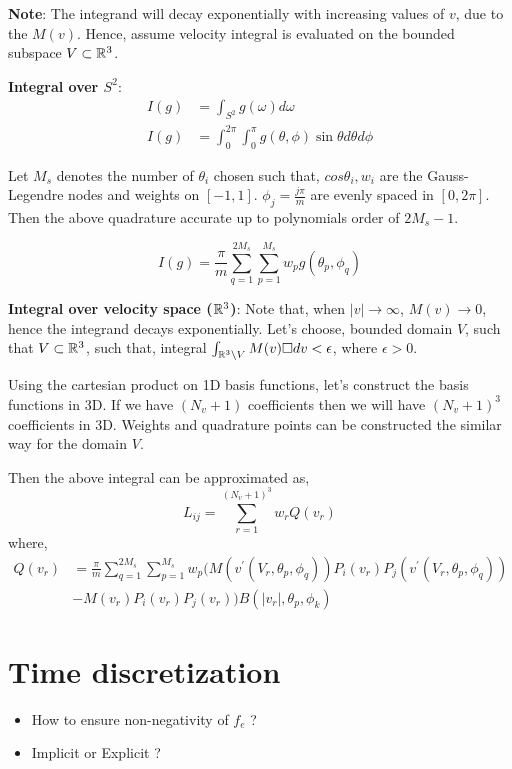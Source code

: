 \documentclass{article}
\begin{document}
\textbf{Note}: The integrand will decay exponentially with increasing values of $v$, due to the $M(v)$. Hence, assume velocity integral is evaluated on the bounded subspace $V\subset \mathbb{R}^3$.

\textbf{Integral over $S^2$}: 
\begin{align}
    I(g) &= \int_{S^2} g(\omega) d\omega\\
    I(g) &= \int_{0}^{2\pi} \int_{0}^{\pi} g(\theta,\phi) \sin\theta d\theta d\phi 
\end{align}

Let $M_s$ denotes the number of $\theta_i$ chosen such that, $cos\theta_i,w_i$ are the Gauss-Legendre nodes and weights on $[-1,1]$. $\phi_j = \frac{j\pi}{m}$  are evenly spaced in $[0,2\pi]$. Then the above quadrature accurate up to polynomials order of $2M_s-1$.

\begin{equation}
    I(g) = \frac{\pi}{m} \sum_{q=1}^{2M_s} \sum_{p=1}^{M_s} w_p g(\theta_p,\phi_q) \label{eq:sphere_quadrature}
\end{equation}

\textbf{Integral over velocity space ($\mathbb{R}^3$)}: Note that, when $|v|\rightarrow \infty$, $M(v)\rightarrow 0$, hence the integrand decays exponentially. Let's choose, bounded domain $V$, such that $V\subset \mathbb{R}^3$, such that, integral $\int_{\mathbb{R}^3\setminus V} M(v) \square dv < \epsilon$, where $\epsilon >0$. 

Using the cartesian product on 1D basis functions, let's construct the basis functions in 3D. If we have $(N_v +1)$ coefficients then we will have $(N_v+1)^3$ coefficients in 3D. Weights and quadrature points can be constructed the similar way for the domain $V$.  

Then the above integral can be approximated as, 
\begin{equation}
    L_{ij} = \sum_{r=1}^{(N_v+1)^3} w_r Q(v_r)
\end{equation} where, 
\begin{align}
    Q(v_r) &= \frac{\pi}{m} \sum_{q=1}^{2M_s} \sum_{p=1}^{M_s} w_p (M(v^\prime(V_r,\theta_p,\phi_q)) P_i(v_r)P_j(v^\prime(V_r,\theta_p,\phi_q))  \\&- M(v_r) P_i(v_r) P_j(v_r) )  B(|v_r|,\theta_p,\phi_k)
\end{align}





    




\section{Time discretization}
\label{sec:time_discretization}

\begin{itemize}
    \item How to ensure non-negativity of $f_e$ ? 
    \item Implicit or Explicit ? 
\end{itemize}



\end{document}
